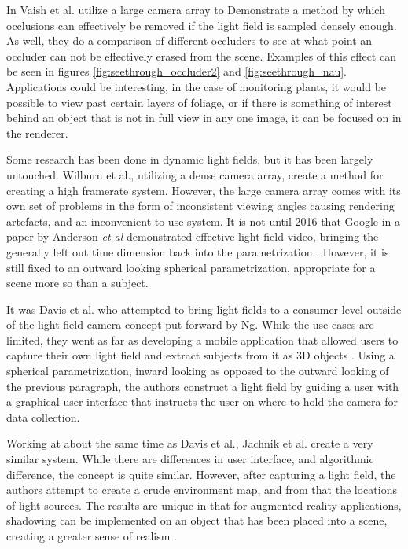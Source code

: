 \documentclass[12pt]{report}
\begin{document}
In \cite{Vaish06} Vaish et al. utilize a large camera array to Demonstrate a method by which occlusions can effectively be removed if the light field is sampled densely enough. As well, they do a comparison of different occluders to see at what point an occluder can not be effectively erased from the scene. Examples of this effect can be seen in figures \ref{fig:seethrough_occluder2} and \ref{fig:seethrough_nau}. Applications could be interesting, in the case of monitoring plants, it would be possible to view past certain layers of foliage, or if there is something of interest behind an object that is not in full view in any one image, it can be focused on in the renderer.

Some research has been done in dynamic light fields, but it has been largely untouched. Wilburn et al., utilizing a dense camera array, create a method for creating a high framerate system. However, the large camera array comes with its own set of problems in the form of inconsistent viewing angles causing rendering artefacts, and an inconvenient-to-use system. It is not until 2016 that Google in a paper by Anderson \emph{et al} demonstrated effective light field video, bringing the generally left out time dimension back into the parametrization \cite{Anderson16}. However, it is still fixed to an outward looking spherical parametrization, appropriate for a scene more so than a subject. 

It was Davis et al. who attempted to bring light fields to a consumer level outside of the light field camera concept put forward by Ng. While the use cases are limited, they went as far as developing a mobile application that allowed users to capture their own light field and extract subjects from it as 3D objects \cite{Davis12}. Using a spherical parametrization, inward looking as opposed to the outward looking of the previous paragraph, the authors construct a light field by guiding a user with a graphical user interface that instructs the user on where to hold the camera for data collection.

Working at about the same time as Davis et al., Jachnik et al. create a very similar system. While there are differences in user interface, and algorithmic difference, the concept is quite similar. However, after capturing a light field, the authors attempt to create a crude environment map, and from that the locations of light sources. The results are unique in that for augmented reality applications, shadowing can be implemented on an object that has been placed into a scene, creating a greater sense of realism \cite{Jachnik13}.
\end{document}
